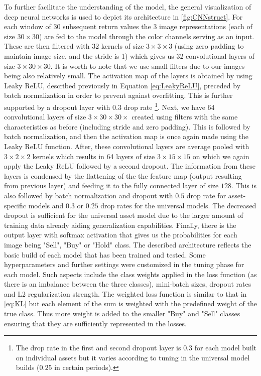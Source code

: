 \documentclass[11pt, a4paper]{article}
\begin{document}
To further facilitate the understanding of the model, the general visualization of deep neural networks is used to depict its architecture in \ref{fig:CNNstruct}. For each window of 30 subsequent return values the 3 image representations (each of size $30 \times 30$) are fed to the model through the color channels serving as an input. These are then filtered with $32$ kernels of size $3 \times 3 \times 3$ (using zero padding to maintain image size, and the stride is 1) which gives us 32 convolutional layers of size $3 \times 30 \times 30$. It is worth to note that we use small filters due to our images being also relatively small. The activation map of the layers is obtained by using Leaky ReLU, described previously in Equation \ref{eq:LeakyReLU}, preceded by batch normalization in order to prevent against overfitting. This is further supported by a dropout layer with $0.3$ drop rate \footnote{The drop rate in the first and second dropout layer is $0.3$ for each model built on individual assets but it varies according to tuning in the universal model builds ($0.25$ in certain periods).}. Next, we have 64 convolutional layers of size $3 \times 30 \times 30 \times$ created using filters with the same characteristics as before (including stride and zero padding). This is followed by batch normalization, and then the activation map is once again made using the Leaky ReLU function. After, these convolutional layers are average pooled with $3 \times 2 \times 2$ kernels which results in 64 layers of size $3 \times 15 \times 15$ on which we again apply the Leaky ReLU followed by a second dropout. The information from these layers is condensed by the flattening of the the feature map (output resulting from previous layer) and feeding it to the fully connected layer of size $128$. This is also followed by batch normalization and dropout with $0.5$ drop rate for asset-specific models and $0.3$ or $0.25$ drop rates for the universal models. The decreased dropout is sufficient for the universal asset model due to the larger amount of training data already aiding generalization capabilities. Finally, there is the output layer with softmax activation that gives us the probabilities for each image being "Sell", "Buy" or "Hold" class. The described architecture reflects the basic build of each model that has been trained and tested. Some hyperparameters and further settings were customized in the tuning phase for each model. Such aspects include the class weights applied in the loss function (as there is an imbalance between the three classes), mini-batch sizes, dropout rates and L2 regularization strength. The weighted loss function is similar to that in \ref{eq:KL} but each element of the sum is weighted with the predefined weight of the true class. Thus more weight is added to the smaller "Buy" and "Sell" classes ensuring that they are sufficiently represented in the losses.
\end{document}
